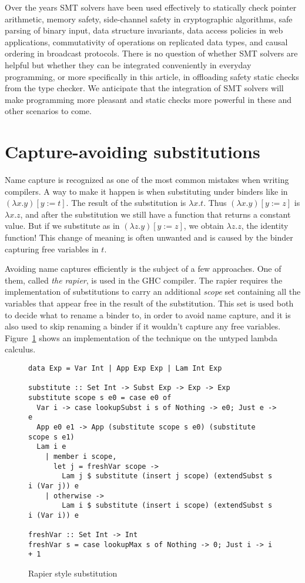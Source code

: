 \documentclass[acmtog, anonymous]{acmart}
\begin{document}
Over the years SMT solvers have been used effectively to statically check pointer
arithmetic, memory safety, side-channel safety in cryptographic algorithms,
safe parsing of binary input, data structure invariants, data access policies in web applications,
commutativity of operations on replicated data types, and causal ordering in
broadcast protocols. There is no question of whether SMT solvers are
helpful but whether they can be integrated conveniently in everyday
programming, or more specifically in this article, in offloading safety static
checks from the type checker.
We anticipate that the integration of SMT solvers will make programming more
pleasant and static checks more powerful in these and other scenarios to come.


\section{Capture-avoiding substitutions}
\label{capture-avoiding-substitution}

Name capture is recognized as one of the most common mistakes when writing compilers.
A way to make it happen is when substituting under binders like in
$(\lambda x. y)[y:=t]$. The result of the substitution is $\lambda x. t$.
Thus $(\lambda x. y)[y:=z]$ is $\lambda x. z$, and after the substitution
we still have a function that returns a constant value. But if we substitute
as in $(\lambda z. y)[y:=z]$, we obtain $\lambda z. z$, the identity function!
This change of meaning is often unwanted and is caused by the binder capturing
free variables in $t$.

Avoiding name captures efficiently is the subject of a few approaches. One of them,
called \textit{the rapier}, is used in the GHC compiler. The rapier requires the
implementation of substitutions to carry an additional \textit{scope} set containing all the
variables that appear free in the result of the substitution. This set is
used both to decide what to rename a binder to, in order to avoid name capture,
and it is also used to skip renaming a binder if it wouldn't capture any free
variables. Figure~\ref{rapier-style-substitution} shows an implementation of the
technique on the untyped lambda calculus.

\begin{figure}
\begin{verbatim}
data Exp = Var Int | App Exp Exp | Lam Int Exp

substitute :: Set Int -> Subst Exp -> Exp -> Exp
substitute scope s e0 = case e0 of
  Var i -> case lookupSubst i s of Nothing -> e0; Just e -> e
  App e0 e1 -> App (substitute scope s e0) (substitute scope s e1)
  Lam i e
    | member i scope,
      let j = freshVar scope ->
        Lam j $ substitute (insert j scope) (extendSubst s i (Var j)) e
    | otherwise ->
        Lam i $ substitute (insert i scope) (extendSubst s i (Var i)) e

freshVar :: Set Int -> Int
freshVar s = case lookupMax s of Nothing -> 0; Just i -> i + 1
\end{verbatim}
\caption{Rapier style substitution}
\label{rapier-style-substitution}
\end{figure}
\end{document}
